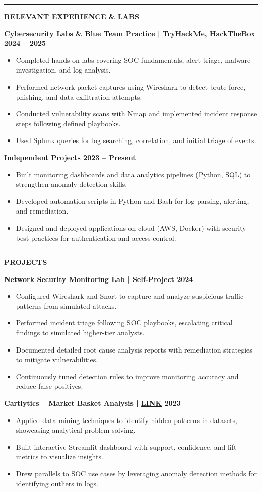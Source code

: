 \documentclass[11pt,a4paper]{article}
\newcommand{\link}[1]{\href{#1}{LINK}}
\newcommand{\resumesection}[1]{
	\vspace{0.2cm}
	\hrule
	\vspace{0.2cm}
	\centerline{\large\textbf{#1}}
	\vspace{0.15cm}
}
\begin{document}
	
	\resumesection{RELEVANT EXPERIENCE \& LABS}
	\noindent \textbf{Cybersecurity Labs \& Blue Team Practice | TryHackMe, HackTheBox \hfill 2024 -- 2025} 
	\begin{itemize}
		\item Completed hands-on labs covering SOC fundamentals, alert triage, malware investigation, and log analysis.
		\item Performed network packet captures using Wireshark to detect brute force, phishing, and data exfiltration attempts.
		\item Conducted vulnerability scans with Nmap and implemented incident response steps following defined playbooks.
		\item Used Splunk queries for log searching, correlation, and initial triage of events.
	\end{itemize}
	
	\vspace{0.1cm}
	\noindent \textbf{Independent Projects \hfill 2023 -- Present} 
	\begin{itemize}
		\item Built monitoring dashboards and data analytics pipelines (Python, SQL) to strengthen anomaly detection skills.
		\item Developed automation scripts in Python and Bash for log parsing, alerting, and remediation.
		\item Designed and deployed applications on cloud (AWS, Docker) with security best practices for authentication and access control.
	\end{itemize}
	
	
	\resumesection{PROJECTS}
	\noindent \textbf{Network Security Monitoring Lab | Self-Project \hfill 2024}
	\begin{itemize}
		\item Configured Wireshark and Snort to capture and analyze suspicious traffic patterns from simulated attacks.
		\item Performed incident triage following SOC playbooks, escalating critical findings to simulated higher-tier analysts.
		\item Documented detailed root cause analysis reports with remediation strategies to mitigate vulnerabilities.
		\item Continuously tuned detection rules to improve monitoring accuracy and reduce false positives.
	\end{itemize}
	
	\vspace{0.1cm}
	\noindent \textbf{Cartlytics – Market Basket Analysis | \link{https://github.com/ValupadasuSaiabbhiram/Cartlytics} \hfill 2023}
	\begin{itemize}
		\item Applied data mining techniques to identify hidden patterns in datasets, showcasing analytical problem-solving.
		\item Built interactive Streamlit dashboard with support, confidence, and lift metrics to visualize insights.
		\item Drew parallels to SOC use cases by leveraging anomaly detection methods for identifying outliers in logs.
	\end{itemize}
	
\end{document}
